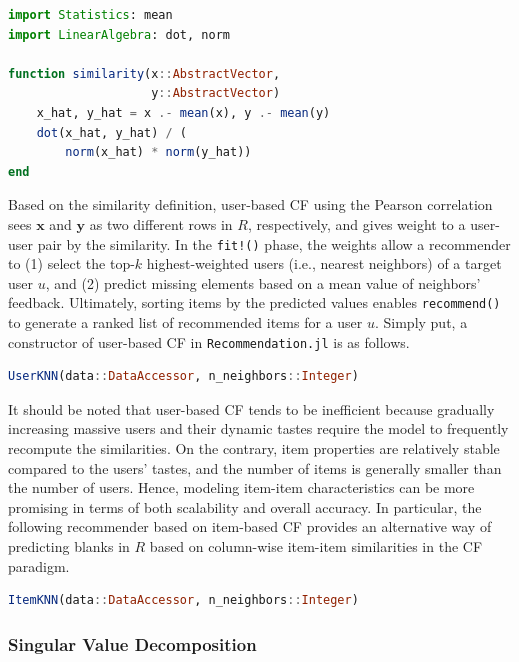 \begin{lstlisting}[language = Julia]
import Statistics: mean
import LinearAlgebra: dot, norm

function similarity(x::AbstractVector,
                    y::AbstractVector)
    x_hat, y_hat = x .- mean(x), y .- mean(y)
    dot(x_hat, y_hat) / (
        norm(x_hat) * norm(y_hat))
end
\end{lstlisting}

Based on the similarity definition, user-based CF using the Pearson correlation \cite{Herlocker1999} sees $\mathbf{x}$ and $\mathbf{y}$ as two different rows in $R$, respectively, and gives weight to a user-user pair by the similarity. In the \texttt{fit!()} phase, the weights allow a recommender to (1) select the top-$k$ highest-weighted users (i.e., nearest neighbors) of a target user $u$, and (2) predict missing elements based on a mean value of neighbors' feedback. Ultimately, sorting items by the predicted values enables \texttt{recommend()} to generate a ranked list of recommended items for a user $u$. Simply put, a constructor of user-based CF in \texttt{Recommendation.jl} is as follows.

\begin{lstlisting}[language = Julia]
UserKNN(data::DataAccessor, n_neighbors::Integer)
\end{lstlisting}

It should be noted that user-based CF tends to be inefficient because gradually increasing massive users and their dynamic tastes require the model to frequently recompute the similarities. On the contrary, item properties are relatively stable compared to the users' tastes, and the number of items is generally smaller than the number of users. Hence, modeling item-item characteristics can be more promising in terms of both scalability and overall accuracy. In particular, the following recommender based on item-based CF \cite{Sarwar2001,Deshpande2004} provides an alternative way of predicting blanks in $R$ based on column-wise item-item similarities in the CF paradigm.

\begin{lstlisting}[language = Julia]
ItemKNN(data::DataAccessor, n_neighbors::Integer)
\end{lstlisting}

\subsubsection{Singular Value Decomposition}
\label{sec:svd}

